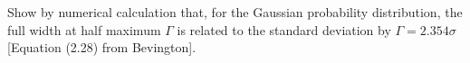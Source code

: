 \item[2.16] Show by numerical calculation that, for the Gaussian probability
  distribution, the full width at half maximum $\Gamma$ is related to the
  standard deviation by $\Gamma = 2.354\sigma$ [Equation (2.28) from Bevington].

